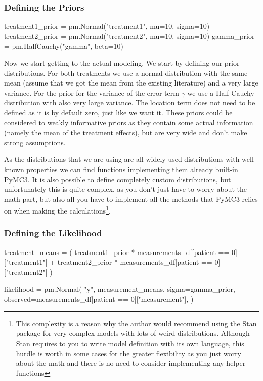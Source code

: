 \documentclass[12pt,a4paper,leqno]{report}
\theoremstyle{plain}
\theoremstyle{definition}
\theoremstyle{remark}
\begin{document}
\subsubsection{Defining the Priors}

\bigskip
\begin{pyverbatim}
treatment1_prior = pm.Normal("treatment1", mu=10, sigma=10)
treatment2_prior = pm.Normal("treatment2", mu=10, sigma=10)
gamma_prior = pm.HalfCauchy("gamma", beta=10)
\end{pyverbatim}
\bigskip

Now we start getting to the actual modeling. We start by defining our prior
distributions. For both treatments we use a normal distribution with the same mean
(assume that we got the mean from the existing literature) and a very large variance.
For the prior for the variance of the error term \(\gamma\) we use a Half-Cauchy
distribution with also very large variance. The location term does not need to be
defined as it is by default zero, just like we want it. These priors could be considered
to weakly informative priors as they contain some actual information (namely the mean of
the treatment effects), but are very wide and don't make strong assumptions.

As the distributions that we are using are all
widely used distributions with well-known properties we can find functions implementing
them already built-in PyMC3. It is also possible to define completely custom
distributions, but unfortunately this is quite complex, as you don't just have to worry
about the math part, but also all you have to implement all the methods that PyMC3
relies on when making the calculations\footnote{This complexity is a reason why the author would recommend using the Stan package for very complex models with lots of weird
distributions. Although Stan requires to you to write model definition with its own
language, this hurdle is worth in some cases for the greater flexibility as you just
worry about the math and there is no need to consider implementing any helper functions}.

\subsubsection{Defining the Likelihood}

\bigskip
\begin{pyverbatim}
treatment_means = (
    treatment1_prior
    * measurements_df[patient == 0]["treatment1"]
    + treatment2_prior
    * measurements_df[patient == 0]["treatment2"]
)

likelihood = pm.Normal(
    "y",
    measurement_means,
    sigma=gamma_prior,
    observed=measurements_df[patient == 0]["measurement"],
)
\end{pyverbatim}
\bigskip
\end{document}
